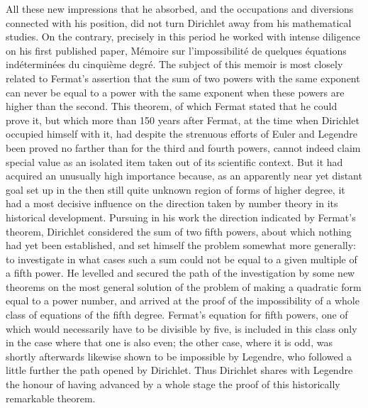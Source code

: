 \documentclass[11pt]{article}
\begin{document}
All these new impressions that he absorbed, and the occupations and diversions connected with his position, did not turn Dirichlet away from his mathematical studies. On the contrary, precisely in this period he worked with intense diligence on his first published paper, Mémoire sur l'impossibilité de quelques équations indéterminées du cinquième degré. The subject of this memoir is most closely related to Fermat's assertion that the sum of two powers with the same exponent can never be equal to a power with the same exponent when these powers are higher than the second. This theorem, of which Fermat stated that he could prove it, but which more than 150 years after Fermat, at the time when Dirichlet occupied himself with it, had despite the strenuous efforts of Euler and Legendre been proved no farther than for the third and fourth powers, cannot indeed claim special value as an isolated item taken out of its scientific context. But it had acquired an unusually high importance because, as an apparently near yet distant goal set up in the then still quite unknown region of forms of higher degree, it had a most decisive influence on the direction taken by number theory in its historical development. Pursuing in his work the direction indicated by Fermat's theorem, Dirichlet considered the sum of two fifth powers, about which nothing had yet been established, and set himself the problem somewhat more generally: to investigate in what cases such a sum could not be equal to a given multiple of a fifth power. He levelled and secured the path of the investigation by some new theorems on the most general solution of the problem of making a quadratic form equal to a power number, and arrived at the proof of the impossibility of a whole class of equations of the fifth degree. Fermat's equation for fifth powers, one of which would necessarily have to be divisible by five, is included in this class only in the case where that one is also even; the other case, where it is odd, was shortly afterwards likewise shown to be impossible by Legendre, who followed a little further the path opened by Dirichlet. Thus Dirichlet shares with Legendre the honour of having advanced by a whole stage the proof of this historically remarkable theorem.
\end{document}
